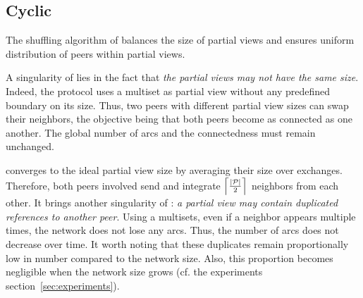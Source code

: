 \subsection{Cyclic}
\label{subsec:cyclic}

The shuffling algorithm of \SPRAY{} balances the size of partial views
and ensures uniform distribution of peers within partial views.



A singularity of \SPRAY{} lies in the fact that \emph{the partial views may
  not have the same size}. Indeed, the protocol uses a multiset as partial view
without any predefined boundary on its size. Thus, two peers with different
partial view sizes can swap their neighbors, the objective being that both
peers become as connected as one another. The global number of arcs and the
connectedness must remain unchanged.

\SPRAY{} converges to the ideal partial view size by averaging their size
over exchanges. Therefore, both peers involved send and integrate
$\left\lceil|\mathcal{P}|\over{2}\right\rceil$ neighbors from each other.  It
brings another singularity of \SPRAY{}: \emph{a partial view may contain
  duplicated references to another peer}. Using a multisets, even if a neighbor
appears multiple times, the network does not lose any arcs.  Thus, the number
of arcs does not decrease over time. It worth noting that these duplicates
remain proportionally low in number compared to the network size. Also, this
proportion becomes negligible when the network size grows (cf. the experiments
section~\ref{sec:experiments}). 


